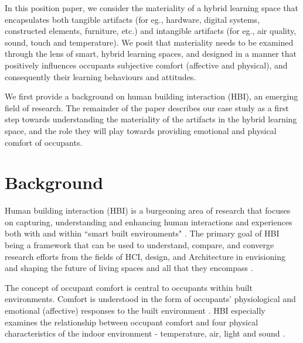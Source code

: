 \documentclass[acmconf, anonymous, review]{acmart}
\begin{document}
In this position paper, we consider the materiality of a hybrid learning space that encapsulates both tangible artifacts (for eg., hardware, digital systems, constructed elements, furniture, etc.) and intangible artifacts (for eg., air quality, sound, touch and temperature). We posit that materiality needs to be examined through the lens of smart, hybrid learning spaces, and designed in a manner that positively influences occupants subjective comfort (affective and physical), and consequently their learning behaviours and attitudes.

We first provide a background on human building interaction (HBI), an emerging field of research. The remainder of the paper describes our case study as a first step towards understanding the materiality of the artifacts in the hybrid learning space, and the role they will play towards providing emotional and physical comfort of occupants. 





\section{Background}
Human building interaction (HBI) is a burgeoning area of research that focuses on capturing, understanding and enhancing human interactions and experiences both with and within ``smart built environments" \cite{alavi2016future}. The primary goal of HBI being a framework that can be used to understand, compare, and converge research efforts from the fields of HCI, design, and Architecture in envisioning and shaping the future of living spaces and all that they encompass \cite{nembrini2017human, alavi2018artifacts}. 

The concept of occupant comfort is central to occupants within built environments. Comfort is understood in the form of occupants' physiological and emotional (affective) responses to the built environment \cite{alavi2017comfort}. HBI especially examines the relationship between occupant comfort and four physical characteristics of the indoor environment - temperature, air, light and sound \cite{hawkes2007environmental, bluyssen2009indoor}. 
\end{document}
